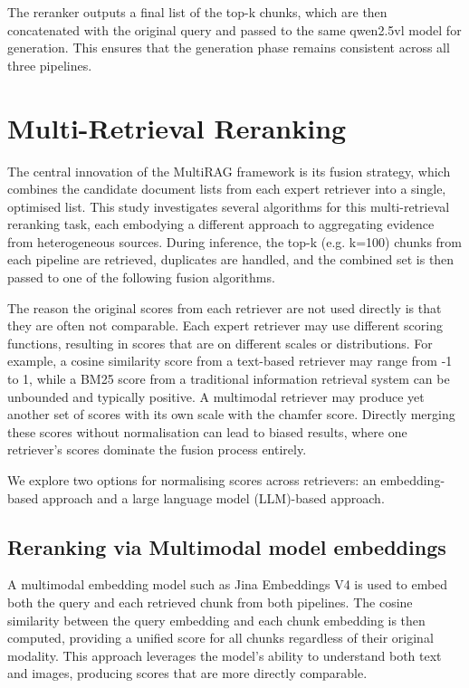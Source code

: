 \documentclass[12pt,twoside]{report}
\begin{document}
The reranker outputs a final list of the top-k chunks, which are then concatenated with the original query and passed to the same qwen2.5vl model for generation. This ensures that the generation phase remains consistent across all three pipelines.

\section{Multi-Retrieval Reranking}

The central innovation of the MultiRAG framework is its fusion strategy, which combines the candidate document lists from each expert retriever into a single, optimised list. This study investigates several algorithms for this multi-retrieval reranking task, each embodying a different approach to aggregating evidence from heterogeneous sources. During inference, the top-k (e.g. k=100) chunks from each pipeline are retrieved, duplicates are handled, and the combined set is then passed to one of the following fusion algorithms.

The reason the original scores from each retriever are not used directly is that they are often not comparable. Each expert retriever may use different scoring functions, resulting in scores that are on different scales or distributions. For example, a cosine similarity score from a text-based retriever may range from -1 to 1, while a BM25 score from a traditional information retrieval system can be unbounded and typically positive. A multimodal retriever may produce yet another set of scores with its own scale with the chamfer score. Directly merging these scores without normalisation can lead to biased results, where one retriever's scores dominate the fusion process entirely.

We explore two options for normalising scores across retrievers: an embedding-based approach and a large language model (LLM)-based approach.

\subsection{Reranking via Multimodal model embeddings}
A multimodal embedding model such as Jina Embeddings V4\cite{JinaV4} is used to embed both the query and each retrieved chunk from both pipelines. The cosine similarity between the query embedding and each chunk embedding is then computed, providing a unified score for all chunks regardless of their original modality. This approach leverages the model's ability to understand both text and images, producing scores that are more directly comparable.
\end{document}
